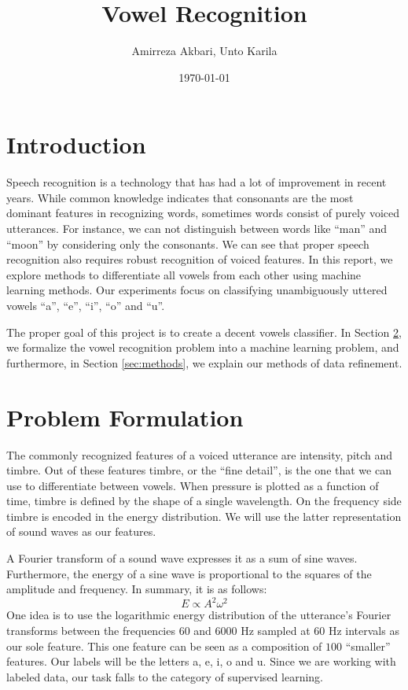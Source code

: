 \documentclass[letterpaper,12pt]{article}
\begin{document}
\title{Vowel Recognition}
\author{Amirreza Akbari, Unto Karila}
\date{\AdvanceDate[-1]\today}
\maketitle

\section{Introduction}

Speech recognition is a technology that has had a lot of improvement in recent years. While common knowledge indicates that consonants are the most dominant features in recognizing words, sometimes words consist of purely voiced utterances. For instance, we can not distinguish between words like ``man'' and ``moon'' by considering only the consonants. We can see that proper speech recognition also requires robust recognition of voiced features. In this report, we explore methods to differentiate all vowels from each other using machine learning methods. Our experiments focus on classifying unambiguously uttered vowels ``a'', ``e'', ``i'', ``o'' and ``u''.

The proper goal of this project is to create a decent vowels classifier. In Section \ref{sec:problem-formulation}, we formalize the vowel recognition problem into a machine learning problem, and furthermore, in Section \ref{sec:methods}, we explain our methods of data refinement. 


\section{Problem Formulation}\label{sec:problem-formulation}

The commonly recognized features of a voiced utterance are intensity, pitch and timbre. Out of these features timbre, or the ``fine detail'', is the one that we can use to differentiate between vowels. When pressure is plotted as a function of time, timbre is defined by the shape of a single wavelength. On the frequency side timbre is encoded in the energy distribution. We will use the latter representation of sound waves as our features.

A Fourier transform of a sound wave expresses it as a sum of sine waves. Furthermore, the energy of a sine wave is proportional to the squares of the amplitude and frequency. In summary, it is as follows: 
\begin{equation}
E\propto A^2\omega^2
\end{equation}
One idea is to use the logarithmic energy distribution of the utterance's Fourier transforms between the frequencies $60$ and $6000$ Hz sampled at $60$ Hz intervals as our sole feature. This one feature can be seen as a composition of $100$ ``smaller'' features. Our labels will be the letters a, e, i, o and u. Since we are working with labeled data, our task falls to the category of supervised learning.
\end{document}
